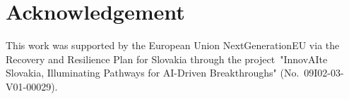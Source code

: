 \documentclass[conference]{IEEEtran}
\begin{document}
\section*{Acknowledgement}
This work was supported by the European Union NextGenerationEU via the Recovery
and Resilience Plan for Slovakia through the project\
"InnovAIte Slovakia, Illuminating Pathways for AI-Driven Breakthroughs"
(No.~09I02-03-V01-00029).



\end{document}
